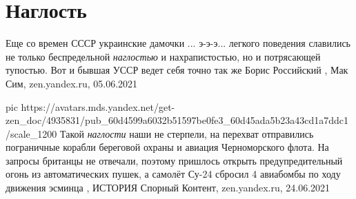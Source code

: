  
 
 
 
 
\chapter{Наглость}
\label{sec:slova.naglost}

Еще со времен СССР украинские дамочки ... э-э-э... легкого поведения славились
не только беспредельной \emph{наглостью} и нахрапистостью, но и потрясающей
тупостью.  Вот и бывшая УССР ведет себя точно так же
Борис Российский
, 
Мак Сим, zen.yandex.ru, 05.06.2021

\ifcmt
  pic https://avatars.mds.yandex.net/get-zen_doc/4935831/pub_60d4599a6032b51597be0fe3_60d45ada5b23a43cd1a7ddc1/scale_1200
\fi
Такой \emph{наглости} наши не стерпели, на перехват отправились пограничные корабли
береговой охраны и авиация Черноморского флота. На запросы британцы не
отвечали, поэтому пришлось открыть предупредительный огонь из автоматических
пушек, а самолёт Су-24 сбросил 4 авиабомбы по ходу движения эсминца
, 
ИСТОРИЯ Спорный Контент, zen.yandex.ru, 24.06.2021 

